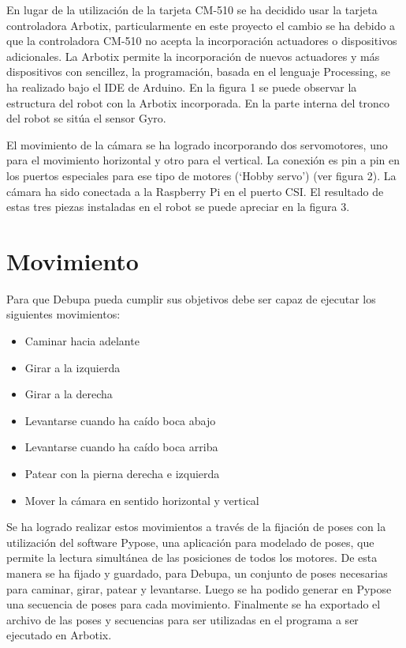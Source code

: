 \documentclass[conference, letterpaper]{IEEEtranMC1}
\begin{document}
En lugar de la utilización de la tarjeta CM-510 se ha decidido usar la tarjeta controladora Arbotix, particularmente en este proyecto el cambio se ha debido a que la controladora CM-510 no acepta la incorporación actuadores o dispositivos adicionales. La Arbotix permite la incorporación de nuevos actuadores y más dispositivos con sencillez, la programación, basada en el lenguaje Processing, se ha realizado bajo el IDE de Arduino. En la figura 1 se puede observar la estructura del robot con la Arbotix incorporada. En la parte interna del tronco del robot se sitúa el sensor Gyro. 

El movimiento de la cámara se ha logrado incorporando dos servomotores, uno para el movimiento horizontal y otro para el vertical. La conexión es pin a pin en los puertos especiales para ese tipo de motores (‘Hobby servo’) \cite{trossen} (ver figura 2). La cámara ha sido conectada a la Raspberry Pi en el puerto CSI. El resultado de estas tres piezas instaladas en el robot se puede apreciar en la figura 3.



\section{Movimiento}
\label{sec:movimiento}


Para que Debupa pueda cumplir sus objetivos debe ser capaz de ejecutar los siguientes movimientos:
\begin{itemize}
\setlength{\itemsep}{1pt}
\item Caminar hacia adelante
\item Girar a la izquierda
\item Girar a la derecha
\item Levantarse cuando ha caído boca abajo
\item Levantarse cuando ha caído boca arriba 
\item Patear con la pierna derecha e izquierda
\item Mover la cámara en sentido horizontal y vertical 

 
\end{itemize}

Se ha logrado realizar estos movimientos a través de la fijación de poses con la utilización del software Pypose, una aplicación para modelado de poses, que permite la lectura simultánea de las posiciones de todos los motores. De esta manera se ha fijado y guardado, para Debupa, un conjunto de poses necesarias para caminar, girar, patear y levantarse. Luego se ha podido generar en Pypose una secuencia de poses para cada movimiento. Finalmente se ha exportado el archivo de las poses y secuencias para ser utilizadas en el programa a ser ejecutado en Arbotix. 
\end{document}
